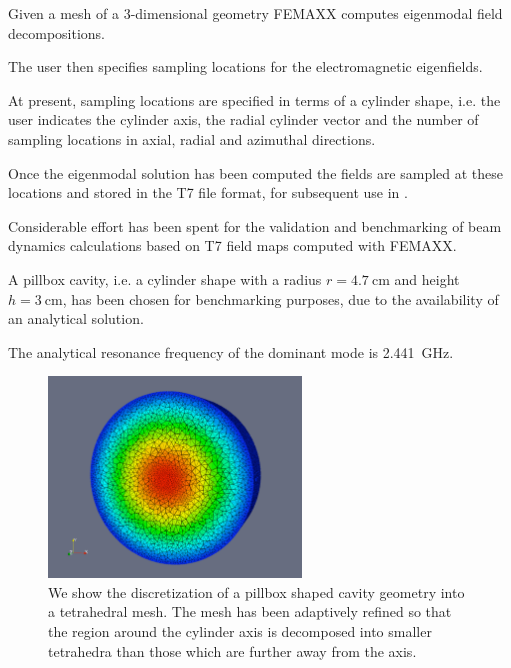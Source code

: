 Given a mesh of a $3$-dimensional geometry FEMAXX computes eigenmodal field
decompositions.

The user then specifies sampling locations for the electromagnetic eigenfields.

At present, sampling locations are specified in terms of a cylinder shape,
i.e. the user indicates the cylinder axis, the radial cylinder vector and
the number of sampling locations in axial, radial and azimuthal directions.

Once the eigenmodal solution has been computed the fields are sampled at
these locations and stored in the T7 file format, for subsequent use in \opal.

Considerable effort has been spent for the validation and benchmarking of
beam dynamics calculations based on T7 field maps computed with FEMAXX.

A pillbox cavity, i.e. a cylinder shape with a radius $r = \SI{4.7}{\centi\meter}$ and
height $h = \SI{3}{\centi\meter}$, has been chosen for benchmarking purposes,
due to the availability of an analytical solution.

The analytical resonance frequency of the dominant mode is \SI{2.441}{\giga\hertz}.


\begin{figure}[!htb]
\centering
\includegraphics[width=0.6\textwidth]{./figures/adaptivePillboxMesh.pdf}
\caption[Tetrahedral mesh of a pillbox shaped cavity]{We show the discretization of a pillbox shaped cavity geometry into a tetrahedral mesh. The mesh has been adaptively refined so that the region around the cylinder axis is decomposed into smaller tetrahedra than those which are further away from the axis.}
\label{fig:pillbox_adaptively_refined_mesh}
\end{figure}

